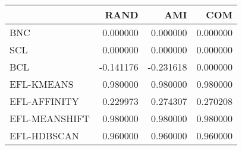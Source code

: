 \begin{tabular}{lrrr}
\toprule
 & RAND & AMI & COM \\
\midrule
BNC & 0.000000 & 0.000000 & 0.000000 \\
SCL & 0.000000 & 0.000000 & 0.000000 \\
BCL & -0.141176 & -0.231618 & 0.000000 \\
EFL-KMEANS & 0.980000 & 0.980000 & 0.980000 \\
EFL-AFFINITY & 0.229973 & 0.274307 & 0.270208 \\
EFL-MEANSHIFT & 0.980000 & 0.980000 & 0.980000 \\
EFL-HDBSCAN & 0.960000 & 0.960000 & 0.960000 \\
\bottomrule
\end{tabular}

